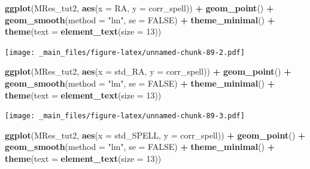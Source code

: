 \documentclass[
]{book}
\newenvironment{Shaded}{\begin{snugshade}}{\end{snugshade}}
\newcommand{\AttributeTok}[1]{\textcolor[rgb]{0.13,0.29,0.53}{#1}}
\newcommand{\ConstantTok}[1]{\textcolor[rgb]{0.56,0.35,0.01}{#1}}
\newcommand{\DecValTok}[1]{\textcolor[rgb]{0.00,0.00,0.81}{#1}}
\newcommand{\FunctionTok}[1]{\textcolor[rgb]{0.13,0.29,0.53}{\textbf{#1}}}
\newcommand{\NormalTok}[1]{#1}
\newcommand{\SpecialCharTok}[1]{\textcolor[rgb]{0.81,0.36,0.00}{\textbf{#1}}}
\newcommand{\StringTok}[1]{\textcolor[rgb]{0.31,0.60,0.02}{#1}}
\begin{document}
\begin{Shaded}
\begin{Highlighting}[]
\FunctionTok{ggplot}\NormalTok{(MRes\_tut2, }\FunctionTok{aes}\NormalTok{(}\AttributeTok{x =}\NormalTok{ RA, }\AttributeTok{y =}\NormalTok{ corr\_spell)) }\SpecialCharTok{+} 
  \FunctionTok{geom\_point}\NormalTok{() }\SpecialCharTok{+} 
  \FunctionTok{geom\_smooth}\NormalTok{(}\AttributeTok{method =} \StringTok{"lm"}\NormalTok{, }\AttributeTok{se =} \ConstantTok{FALSE}\NormalTok{) }\SpecialCharTok{+}
  \FunctionTok{theme\_minimal}\NormalTok{() }\SpecialCharTok{+}
  \FunctionTok{theme}\NormalTok{(}\AttributeTok{text =} \FunctionTok{element\_text}\NormalTok{(}\AttributeTok{size =} \DecValTok{13}\NormalTok{)) }
\end{Highlighting}
\end{Shaded}

\texttt{[image: \_main\_files/figure-latex/unnamed-chunk-89-2.pdf]}

\begin{Shaded}
\begin{Highlighting}[]
\FunctionTok{ggplot}\NormalTok{(MRes\_tut2, }\FunctionTok{aes}\NormalTok{(}\AttributeTok{x =}\NormalTok{ std\_RA, }\AttributeTok{y =}\NormalTok{ corr\_spell)) }\SpecialCharTok{+} 
  \FunctionTok{geom\_point}\NormalTok{() }\SpecialCharTok{+} 
  \FunctionTok{geom\_smooth}\NormalTok{(}\AttributeTok{method =} \StringTok{"lm"}\NormalTok{, }\AttributeTok{se =} \ConstantTok{FALSE}\NormalTok{) }\SpecialCharTok{+}
  \FunctionTok{theme\_minimal}\NormalTok{() }\SpecialCharTok{+}
  \FunctionTok{theme}\NormalTok{(}\AttributeTok{text =} \FunctionTok{element\_text}\NormalTok{(}\AttributeTok{size =} \DecValTok{13}\NormalTok{)) }
\end{Highlighting}
\end{Shaded}

\texttt{[image: \_main\_files/figure-latex/unnamed-chunk-89-3.pdf]}

\begin{Shaded}
\begin{Highlighting}[]
\FunctionTok{ggplot}\NormalTok{(MRes\_tut2, }\FunctionTok{aes}\NormalTok{(}\AttributeTok{x =}\NormalTok{ std\_SPELL, }\AttributeTok{y =}\NormalTok{ corr\_spell)) }\SpecialCharTok{+} 
  \FunctionTok{geom\_point}\NormalTok{() }\SpecialCharTok{+} 
  \FunctionTok{geom\_smooth}\NormalTok{(}\AttributeTok{method =} \StringTok{"lm"}\NormalTok{, }\AttributeTok{se =} \ConstantTok{FALSE}\NormalTok{) }\SpecialCharTok{+}
  \FunctionTok{theme\_minimal}\NormalTok{() }\SpecialCharTok{+}
  \FunctionTok{theme}\NormalTok{(}\AttributeTok{text =} \FunctionTok{element\_text}\NormalTok{(}\AttributeTok{size =} \DecValTok{13}\NormalTok{)) }
\end{Highlighting}
\end{Shaded}
\end{document}
